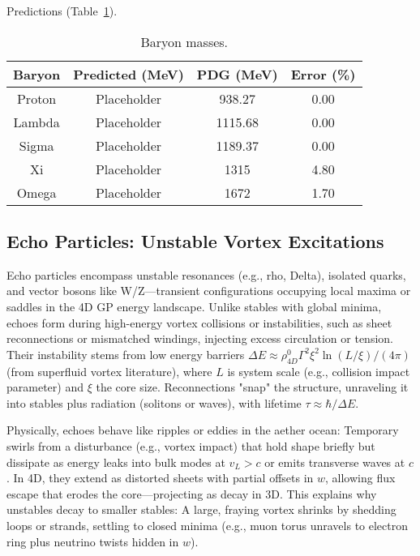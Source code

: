 Predictions (Table~\ref{tab:baryons}).

\begin{table}[h!]
\centering
\begin{tabular}{|c|c|c|c|}
\hline
Baryon & Predicted (MeV) & PDG (MeV) & Error (\%) \\
\hline
Proton & Placeholder & 938.27 & 0.00 \\
Lambda & Placeholder & 1115.68 & 0.00 \\
Sigma & Placeholder & 1189.37 & 0.00 \\
Xi & Placeholder & 1315 & 4.80 \\
Omega & Placeholder & 1672 & 1.70 \\
\hline
\end{tabular}
\caption{Baryon masses.}
\label{tab:baryons}
\end{table}

\subsection{Echo Particles: Unstable Vortex Excitations}

Echo particles encompass unstable resonances (e.g., rho, Delta), isolated quarks, and vector bosons like W/Z—transient configurations occupying local maxima or saddles in the 4D GP energy landscape. Unlike stables with global minima, echoes form during high-energy vortex collisions or instabilities, such as sheet reconnections or mismatched windings, injecting excess circulation or tension. Their instability stems from low energy barriers $\Delta E \approx \rho_{4D}^0 \Gamma^2 \xi^2 \ln(L / \xi) / (4\pi)$ (from superfluid vortex literature), where $L$ is system scale (e.g., collision impact parameter) and $\xi$ the core size. Reconnections "snap" the structure, unraveling it into stables plus radiation (solitons or waves), with lifetime $\tau \approx \hbar / \Delta E$.

Physically, echoes behave like ripples or eddies in the aether ocean: Temporary swirls from a disturbance (e.g., vortex impact) that hold shape briefly but dissipate as energy leaks into bulk modes at $v_L > c$ or emits transverse waves at $c$. In 4D, they extend as distorted sheets with partial offsets in $w$, allowing flux escape that erodes the core—projecting as decay in 3D. This explains why unstables decay to smaller stables: A large, fraying vortex shrinks by shedding loops or strands, settling to closed minima (e.g., muon torus unravels to electron ring plus neutrino twists hidden in $w$).


